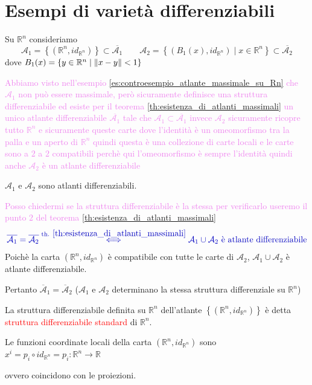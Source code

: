     \section{Esempi di varietà differenziabili}
        \begin{esempio}[$\mathbb{R}^n$]
        \mbox{}

        Su $\mathbb{R}^n$ consideriamo 
        \[ \mathcal{A}_1 = \left\{ \left(\mathbb{R}^n, id_{\mathbb{R}^n}\right) \right\} \subset \overline{\mathcal{A}_1}  \qquad \mathcal{A}_2= \left\{ (B_1(x), id_{\mathbb{R}^n}) \mid x \in \mathbb{R}^n \right\} \subset \overline{\mathcal{A}_2}  \]
        dove $B_1(x)= \left\{y \in \mathbb{R}^n \mid \lVert x-y\rVert < 1 \right\}$
        
        \textcolor{violet}{Abbiamo visto nell'esempio \ref{es:controesempio_atlante_massimale_su_Rn} che $\mathcal{A}_1$ non può essere massimale, però sicuramente definisce una struttura differenziabile
        ed esiste per il teorema \ref{th:esistenza_di_atlanti_massimali} un unico atlante differenziabile $\overline{\mathcal{A}_1}$ tale che $\mathcal{A}_1 \subset \overline{\mathcal{A}_1} $
        invece $\mathcal{A}_2$ sicuramente ricopre tutto $\mathbb{R}^n$ e sicuramente queste carte dove l'identità è un omeomorfismo tra la palla e un aperto di $\mathbb{R}^n$ quindi questa è una collezione
        di carte locali e le carte sono a $2$ a $2$ compatibili perchè qui l'omeomorfismo è sempre l'identità quindi anche $\mathcal{A}_2$ è un atlante differenziabile}

        $\mathcal{A}_1$ e $\mathcal{A}_2$ sono atlanti differenziabili. 

        \textcolor{violet}{Posso chiedermi se la struttura differenziabile è la stessa per verificarlo useremo il punto $2$ del teorema \ref{th:esistenza_di_atlanti_massimali}}
        \[ \color{blu} \overline{\mathcal{A}_1} = \overline{\mathcal{A}_2} \overset{\text{th. } \ref{th:esistenza_di_atlanti_massimali}}{\iff} \mathcal{A}_1 \cup \mathcal{A}_2 \text{ è atlante differenziabile} \]
        Poichè la carta $\left(\mathbb{R}^n, id_{\mathbb{R}^n}\right) $ è compatibile con tutte le carte di $\mathcal{A}_2$, $\mathcal{A}_1 \cup \mathcal{A}_2$ è atlante
        differenziabile.

        Pertanto $\overline{\mathcal{A}}_1 = \overline{\mathcal{A}}_2$ \textcolor{blu}{($\mathcal{A}_1$ e $\mathcal{A}_2$ determinano la stessa struttura differenziale su $\mathbb{R}^n$)}

        La struttura differenziabile definita su $\mathbb{R}^n$ dell'atlante $\left\{ \left(\mathbb{R}^n, id_{\mathbb{R}^n}\right) \right\}$ è detta \textcolor{red}{struttura differenziabile standard}
        di $\mathbb{R}^n$.

        Le funzioni coordinate locali della carta $ \left(\mathbb{R}^n, id_{\mathbb{R}^n}\right)$ sono $x^i = p_i \circ id_{\mathbb{R}^n} =p_i \colon \mathbb{R}^n \to \mathbb{R}$

        ovvero coincidono con le proiezioni.
        \end{esempio}
